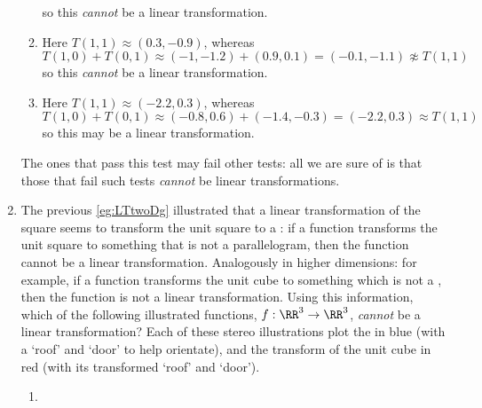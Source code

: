 \begin{example}
\begin{enumerate}
\begin{solution}
\begin{enumerate}
so this \emph{cannot} be a linear transformation.
\item Here \(T(1,1)\approx(0.3,-0.9)\), whereas
\(T(1,0)+T(0,1)\approx (-1,-1.2)+(0.9,0.1)
=(-0.1,-1.1)\not\approx T(1,1)\) 
so this \emph{cannot} be a linear transformation.
\item Here \(T(1,1)\approx(-2.2,0.3)\), whereas
\(T(1,0)+T(0,1)\approx (-0.8,0.6)+(-1.4,-0.3)
=(-2.2,0.3)\approx T(1,1)\) 
so this may be a linear transformation.
\end{enumerate} 
The ones that pass this test may fail other tests: all we are sure of is that those that fail such tests \emph{cannot} be linear transformations.
\end{solution}

\item\label{eg:LTthreeDg}
The previous \autoref{eg:LTtwoDg} illustrated that a linear transformation of the square seems to transform the unit square to a : if a function transforms the unit square to something that is not a parallelogram, then the function cannot be a linear transformation.
Analogously in higher dimensions: for example, if a function transforms the unit cube to something which is not a , then the function is not a linear transformation.
Using this information, which of the following illustrated functions, \(f:\RR^3\to\RR^3\), \emph{cannot} be a linear transformation?
Each of these stereo illustrations plot the  in blue (with a `roof' and `door' to help orientate), and the transform of the unit cube in red (with its transformed `roof' and `door').
\begin{enumerate}
\item \def\unithousesize{small}
\end{enumerate}
\end{enumerate}
\end{example}
